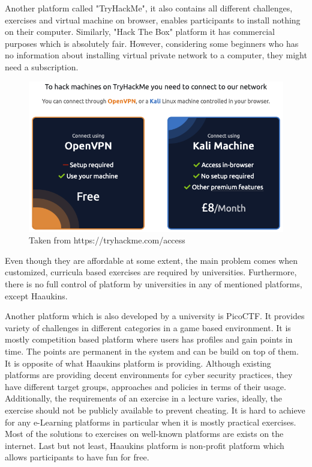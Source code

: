 Another platform called "TryHackMe", it also contains all different challenges, exercises and virtual machine on browser, enables participants to install nothing on their computer. Similarly, "Hack The Box" platform it has commercial purposes which is absolutely fair. However, considering some beginners who has no information about installing virtual private network to a computer, they might need a subscription. 

\begin{figure}[htbp]
\centerline{\includegraphics[scale=.5]{figures/try-hack-me.png}}
\caption{Taken from https://tryhackme.com/access}
\label{fig}
\end{figure}
 
 
Even though they are affordable at some extent, the main problem comes when customized, curricula based exercises are required by universities. Furthermore, there is no full control of platform by universities in any of mentioned platforms, except Haaukins. 

Another platform which is also developed by a university is PicoCTF\cite{183443}.
It provides variety of challenges in different categories in a game based environment. It is mostly competition based platform where users has profiles and gain points in time. The points are permanent in the system and can be build on top of them. It is opposite of what Haaukins platform is providing.
Although existing platforms are providing decent environments for cyber security practices, they have different target groups, approaches and policies in terms of their usage. Additionally, the requirements of an exercise in a lecture varies, ideally, the exercise should not be publicly available to prevent cheating. It is hard to achieve for any e-Learning platforms in particular when it is mostly practical exercises. Most of the solutions to exercises on well-known platforms are exists on the internet. Last but not least, Haaukins platform is non-profit platform which allows participants to have fun for free. 
